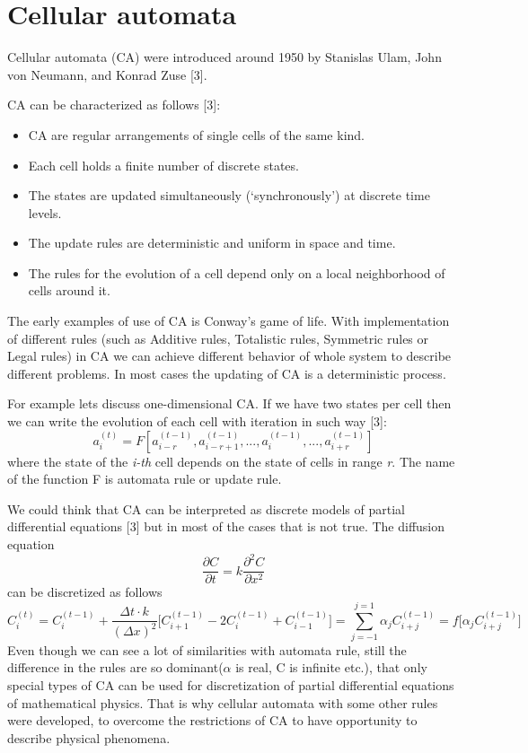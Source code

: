 
\section{Cellular automata}

Cellular automata (CA) were introduced around 1950 by Stanislas Ulam, John von Neumann, and Konrad Zuse [3].

CA can be characterized as follows [3]:
\begin{itemize}
\item CA are regular arrangements of single cells of the same kind. 
\item Each cell holds a finite number of discrete states. 
\item The states are updated simultaneously (‘synchronously’) at discrete time levels. 
\item The update rules are deterministic and uniform in space and time. 
\item The rules for the evolution of a cell depend only on a local neighborhood of cells around it.
\end{itemize}

The early examples of use of CA is Conway's game of life. With implementation of different rules (such as Additive rules, Totalistic rules, Symmetric rules or Legal rules) in CA we can achieve different behavior of whole system to describe different problems. In most cases the updating of CA is a deterministic process.

For example lets discuss one-dimensional CA. If we have two states per cell then we can write the evolution of each cell with iteration in such way [3]:
\begin{equation}
a_i^{(t)}=F[a_{i-r}^{(t-1)},a_{i-r+1}^{(t-1)},...,a_{i}^{(t-1)},...,a_{i+r}^{(t-1)}]
\end{equation}
where the state of the \textit{i-th} cell depends on the state of cells in range \textit{r}. The name of the function F is automata rule or update rule.

We could think that CA can be interpreted as discrete models of partial differential equations [3] but in most of the cases that is not true.  The diffusion equation
\begin{equation}
\frac{\partial C}{\partial t} = k\frac{\partial^2 C}{\partial x^2}
\end{equation}
can be discretized as follows
\begin{equation}
C_i^{(t)} = C_i^{(t-1)} + \frac{\Delta t \cdot k}{(\Delta x)^2} \bigg[ C_{i+1}^{(t-1)} -2C_{i}^{(t-1)} + C_{i-1}^{(t-1)} \bigg] = \sum_{j=-1}^{j=1} \alpha_j C_{i+j}^{(t-1)} = f \bigg[ \alpha_j C_{i+j}^{(t-1)} \bigg]
\end{equation}
Even though we can see a lot of similarities with automata rule, still the difference in the rules are so dominant($\alpha$ is real, C is infinite etc.), that only special types of CA can be used for discretization of partial differential equations of mathematical physics. That is why cellular automata with some other rules were developed, to overcome the restrictions of CA to have opportunity to describe physical phenomena.

